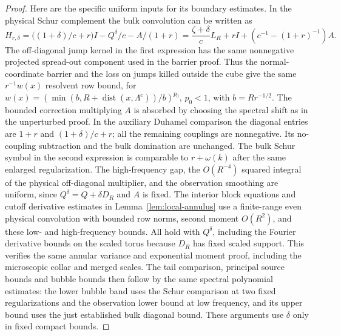 \documentclass[11pt]{article}
\theoremstyle{definition}
\newcommand{\dist}{\operatorname{dist}}
\begin{document}
\begin{proof}
Here are the specific uniform inputs for its boundary estimates.
In the physical Schur complement the bulk convolution can
be written as
\begin{equation}
 H_{r,\delta}
  =\bigl((1+\delta)/c+r\bigr)I
       -Q^\delta/c-A/(1+r)
  =\frac{\zeta+\delta}{c} L_R+rI+
                   \left(c^{-1}-(1+r)^{-1}\right)A .
\end{equation}
The off-diagonal jump kernel in the first expression has
the same nonnegative projected spread-out component used
in the barrier proof. Thus the normal-coordinate barrier
and the loss on jumps killed outside the cube give the same
\(r^{-1}w(x)\) resolvent row bound, for
\(w(x)=(\min(b,R+\dist(x,\Lambda^c))/b)^{p_0}\),
\(p_0<1\), with \(b=Rr^{-1/2}\).
The bounded correction multiplying \(A\) is absorbed by
choosing the spectral shift as in the unperturbed proof.
In the auxiliary Duhamel comparison the diagonal entries
are \(1+r\) and \((1+\delta)/c+r\); all the remaining
couplings are nonnegative. Its no-coupling subtraction and
the bulk domination are unchanged. The bulk Schur symbol in
the second expression is comparable to \(r+\omega(k)\)
after the same enlarged regularization. The high-frequency
gap, the \(O(R^{-4})\) squared integral of the physical
off-diagonal multiplier, and the observation smoothing
are uniform, since \(Q^\delta=Q+\delta D_R\) and \(A\)
is fixed. The interior block equations and cutoff
derivative estimates in Lemma~\ref{lem:local-annulus}
use a finite-range even physical convolution with bounded
row norms, second moment \(O(R^2)\), and these low- and
high-frequency bounds. All hold with \(Q^\delta\), including
the Fourier derivative bounds on the scaled torus because
\(D_R\) has fixed scaled support. This verifies the same
annular variance and exponential moment proof, including
the microscopic collar and merged scales. The tail
comparison, principal source bounds and bubble bounds
then follow by the same spectral polynomial estimates:
the lower bubble band uses the Schur comparison at two
fixed regularizations and the observation lower bound at
low frequency, and its upper bound uses the just established
bulk diagonal bound. These arguments use \(\delta\) only
in fixed compact bounds.


\end{proof}
\end{document}
